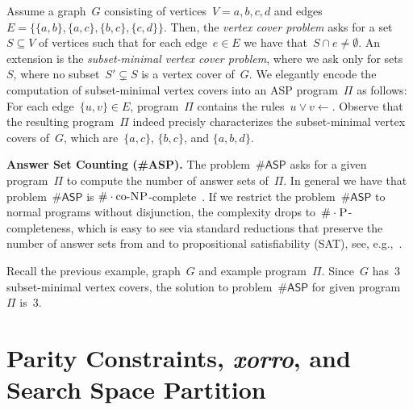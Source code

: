 \documentclass{svproc}
\def\asp{\textsf{\#ASP}\xspace}
\def\SAT{\textsf{SAT}\xspace}
\renewcommand{\P}{\ensuremath{\textsc{P}}\xspace}
\newcommand{\coNP}{\ensuremath{\text{co-}\textsc{NP}}\xspace}
\newcommand{\cnt}[0]{\ensuremath{\#}}
\newcommand{\cntc}[0]{\ensuremath{\cnt\cdot}}
\begin{document}

\begin{example}
Assume a graph~$G$ consisting of vertices~$V=a,b,c,d$
and edges~$E=\{\{a,b\}, \{a,c\}, \{b,c\}, \{c,d\}\}$.
Then, the \emph{vertex cover problem} asks for a set~$S\subseteq V$ of vertices
such that for each edge~$e\in E$ we have that~$S\cap e\neq \emptyset$.
An extension is the \emph{subset-minimal vertex cover problem}, where we ask
only for sets~$S$, where no subset~$S'\subsetneq S$ is a vertex cover of~$G$.
We elegantly encode the computation of subset-minimal vertex covers into an ASP program~$\Pi$ as follows:
For each edge~$\{u,v\}\in E$, program~$\Pi$ contains the rules~$u \vee v \leftarrow$.
Observe that the resulting program~$\Pi$ indeed precisly characterizes the subset-minimal vertex covers of~$G$, which are~$\{a,c\}$, $\{b,c\}$, and $\{a,b,d\}$.
\end{example}

\noindent\textbf{Answer Set Counting (\asp).}
The problem~$\asp$ asks for a given program~$\Pi$ to compute the number of
answer sets of~$\Pi$.
In general we have that problem~$\asp$ is
$\cntc\coNP$-complete~\cite{FichteEtAl17}.
If we restrict the problem~$\asp$ to normal programs without disjunction,
the complexity drops to~$\cntc\P$-completeness,
which is easy to see via standard reductions
that preserve the number of answer sets from and to propositional satisfiability (\SAT), see, e.g.,~\cite{Janhunen06}.

\begin{example}
Recall the previous example, graph~$G$ and example program~$\Pi$.
Since~$G$ has~$3$ subset-minimal vertex covers, the solution to problem~$\asp$
for given program~$\Pi$ is~$3$.
\end{example}


\section{Parity Constraints, \emph{xorro}, and Search Space Partition} \label{sec:parity}
\end{document}
